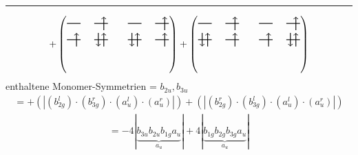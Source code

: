 \documentclass{article}
\begin{document}
\hrule\newpage 
\[ +\left(\text{\begin{tikzpicture}
    \draw[thick] (0,0) -- (0.5,0); %
    \draw[thick] (1,0) -- (1.5,0); %
    \draw[thick] (0,-0.6) -- (0.5,-0.6); %
    \draw[thick] (1,-0.6) -- (1.5,-0.6); %
\draw[->, thick] (1.35, -0.25) -- (1.35, 0.25); 
\draw[-> , thick] (0.35, -0.85) -- (0.35, -0.35); 
 \draw[-> , thick] (1.35, -0.85) -- (1.35, -0.35); 
\draw[<- , thick] (1.15, -0.85) -- (1.15, -0.35); 
\end{tikzpicture}\qquad \begin{tikzpicture}
    \draw[thick] (0,0) -- (0.5,0); %
    \draw[thick] (1,0) -- (1.5,0); %
    \draw[thick] (0,-0.6) -- (0.5,-0.6); %
    \draw[thick] (1,-0.6) -- (1.5,-0.6); %
\draw[->, thick] (1.35, -0.25) -- (1.35, 0.25); 
\draw[-> , thick] (0.35, -0.85) -- (0.35, -0.35); 
\draw[<- , thick] (0.15, -0.85) -- (0.15, -0.35); 
 \draw[-> , thick] (1.35, -0.85) -- (1.35, -0.35); 
\end{tikzpicture}}\right)+\left(\text{\begin{tikzpicture}
    \draw[thick] (0,0) -- (0.5,0); %
    \draw[thick] (1,0) -- (1.5,0); %
    \draw[thick] (0,-0.6) -- (0.5,-0.6); %
    \draw[thick] (1,-0.6) -- (1.5,-0.6); %
\draw[->, thick] (1.35, -0.25) -- (1.35, 0.25); 
\draw[-> , thick] (0.35, -0.85) -- (0.35, -0.35); 
\draw[<- , thick] (0.15, -0.85) -- (0.15, -0.35); 
 \draw[-> , thick] (1.35, -0.85) -- (1.35, -0.35); 
\end{tikzpicture}\qquad \begin{tikzpicture}
    \draw[thick] (0,0) -- (0.5,0); %
    \draw[thick] (1,0) -- (1.5,0); %
    \draw[thick] (0,-0.6) -- (0.5,-0.6); %
    \draw[thick] (1,-0.6) -- (1.5,-0.6); %
\draw[->, thick] (1.35, -0.25) -- (1.35, 0.25); 
\draw[-> , thick] (0.35, -0.85) -- (0.35, -0.35); 
 \draw[-> , thick] (1.35, -0.85) -- (1.35, -0.35); 
\draw[<- , thick] (1.15, -0.85) -- (1.15, -0.35); 
\end{tikzpicture}}\right)\]enthaltene Monomer-Symmetrien = $b_{2u},b_{3u}$\begin{multline*}=+\left(\left|(b_{2g}^{l}) \cdot (b_{3g}^{r}) \cdot (a_{u}^{l}) \cdot (a_{u}^{r})\right|\right)+\left(\left|(b_{2g}^{r}) \cdot (b_{3g}^{l}) \cdot (a_{u}^{l}) \cdot (a_{u}^{r})\right|\right)\end{multline*}
\begin{multline*}
=-4\left|\underbrace{b_{3u} b_{2u} b_{1g} a_{u}}_{a_{u}}\right|+4\left|\underbrace{b_{1g} b_{2g} b_{3g} a_{u}}_{a_{u}}\right|
\end{multline*}
\\\\
\end{document}
